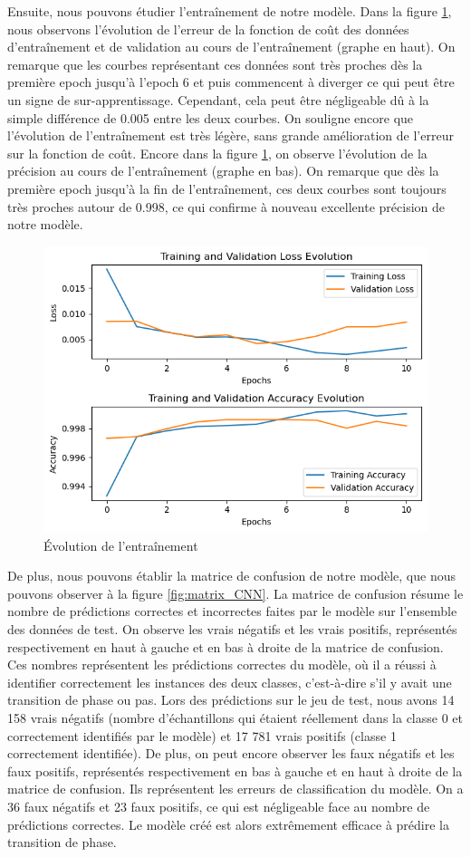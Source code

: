 \documentclass[11pt, parskip=half]{scrartcl} %
\begin{document}
Ensuite, nous pouvons étudier l’entraînement de notre modèle. Dans la figure \ref{fig:train}, nous observons l’évolution de l’erreur de la fonction de coût des données d’entraînement et de validation au cours de l’entraînement (graphe en haut). On remarque que les courbes représentant ces données sont très proches dès la première epoch jusqu’à l’epoch 6 et puis commencent à diverger ce qui peut être un signe de sur-apprentissage. Cependant, cela peut être négligeable dû à la simple différence de 0.005 entre les deux courbes. On souligne encore que l’évolution de l’entraînement est très légère, sans grande amélioration de l’erreur sur la fonction de coût. Encore dans la figure \ref{fig:train}, on observe l’évolution de la précision au cours de l’entraînement (graphe en bas). On remarque que dès la première epoch jusqu’à la fin de l’entraînement, ces deux courbes sont toujours très proches autour de 0.998, ce qui confirme à nouveau excellente précision de notre modèle.

\begin{figure}[h]
	\centering
	\includegraphics[width=0.66\linewidth]{./figures/train.png}
	\caption{Évolution de l'entraînement}
	\label{fig:train}
\end{figure}

De plus, nous pouvons établir la matrice de confusion de notre modèle, que nous pouvons observer à la figure \ref{fig:matrix_CNN}. La matrice de confusion résume le nombre de prédictions correctes et incorrectes faites par le modèle sur l’ensemble des données de test. On observe les vrais négatifs et les vrais positifs, représentés respectivement en haut à gauche et en bas à droite de la matrice de confusion. Ces nombres représentent les prédictions correctes du modèle, où il a réussi à identifier correctement les instances des deux classes,  c’est-à-dire s’il y avait une transition de phase ou pas. Lors des prédictions sur le jeu de test, nous avons 14 158 vrais négatifs (nombre d’échantillons qui étaient réellement dans la classe 0 et correctement identifiés par le modèle) et 17 781 vrais positifs (classe 1 correctement identifiée). De plus, on peut encore observer les faux négatifs et les faux positifs, représentés respectivement en bas à gauche et en haut à droite de la matrice de confusion. Ils représentent les erreurs de classification du modèle. On a 36 faux négatifs et 23 faux positifs, ce qui est négligeable face au nombre de prédictions correctes. Le modèle créé est alors extrêmement efficace à prédire la transition de phase.
\end{document}
